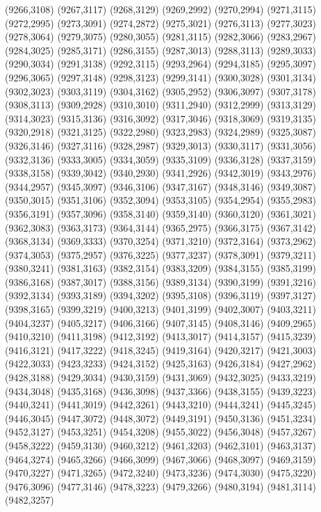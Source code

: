 (9266,3108)
(9267,3117)
(9268,3129)
(9269,2992)
(9270,2994)
(9271,3115)
(9272,2995)
(9273,3091)
(9274,2872)
(9275,3021)
(9276,3113)
(9277,3023)
(9278,3064)
(9279,3075)
(9280,3055)
(9281,3115)
(9282,3066)
(9283,2967)
(9284,3025)
(9285,3171)
(9286,3155)
(9287,3013)
(9288,3113)
(9289,3033)
(9290,3034)
(9291,3138)
(9292,3115)
(9293,2964)
(9294,3185)
(9295,3097)
(9296,3065)
(9297,3148)
(9298,3123)
(9299,3141)
(9300,3028)
(9301,3134)
(9302,3023)
(9303,3119)
(9304,3162)
(9305,2952)
(9306,3097)
(9307,3178)
(9308,3113)
(9309,2928)
(9310,3010)
(9311,2940)
(9312,2999)
(9313,3129)
(9314,3023)
(9315,3136)
(9316,3092)
(9317,3046)
(9318,3069)
(9319,3135)
(9320,2918)
(9321,3125)
(9322,2980)
(9323,2983)
(9324,2989)
(9325,3087)
(9326,3146)
(9327,3116)
(9328,2987)
(9329,3013)
(9330,3117)
(9331,3056)
(9332,3136)
(9333,3005)
(9334,3059)
(9335,3109)
(9336,3128)
(9337,3159)
(9338,3158)
(9339,3042)
(9340,2930)
(9341,2926)
(9342,3019)
(9343,2976)
(9344,2957)
(9345,3097)
(9346,3106)
(9347,3167)
(9348,3146)
(9349,3087)
(9350,3015)
(9351,3106)
(9352,3094)
(9353,3105)
(9354,2954)
(9355,2983)
(9356,3191)
(9357,3096)
(9358,3140)
(9359,3140)
(9360,3120)
(9361,3021)
(9362,3083)
(9363,3173)
(9364,3144)
(9365,2975)
(9366,3175)
(9367,3142)
(9368,3134)
(9369,3333)
(9370,3254)
(9371,3210)
(9372,3164)
(9373,2962)
(9374,3053)
(9375,2957)
(9376,3225)
(9377,3237)
(9378,3091)
(9379,3211)
(9380,3241)
(9381,3163)
(9382,3154)
(9383,3209)
(9384,3155)
(9385,3199)
(9386,3168)
(9387,3017)
(9388,3156)
(9389,3134)
(9390,3199)
(9391,3216)
(9392,3134)
(9393,3189)
(9394,3202)
(9395,3108)
(9396,3119)
(9397,3127)
(9398,3165)
(9399,3219)
(9400,3213)
(9401,3199)
(9402,3007)
(9403,3211)
(9404,3237)
(9405,3217)
(9406,3166)
(9407,3145)
(9408,3146)
(9409,2965)
(9410,3210)
(9411,3198)
(9412,3192)
(9413,3017)
(9414,3157)
(9415,3239)
(9416,3121)
(9417,3222)
(9418,3245)
(9419,3164)
(9420,3217)
(9421,3003)
(9422,3033)
(9423,3233)
(9424,3152)
(9425,3163)
(9426,3184)
(9427,2962)
(9428,3188)
(9429,3034)
(9430,3159)
(9431,3069)
(9432,3025)
(9433,3219)
(9434,3048)
(9435,3168)
(9436,3098)
(9437,3366)
(9438,3155)
(9439,3223)
(9440,3241)
(9441,3019)
(9442,3261)
(9443,3210)
(9444,3241)
(9445,3245)
(9446,3045)
(9447,3072)
(9448,3072)
(9449,3191)
(9450,3136)
(9451,3234)
(9452,3127)
(9453,3251)
(9454,3208)
(9455,3022)
(9456,3048)
(9457,3267)
(9458,3222)
(9459,3130)
(9460,3212)
(9461,3203)
(9462,3101)
(9463,3137)
(9464,3274)
(9465,3266)
(9466,3099)
(9467,3066)
(9468,3097)
(9469,3159)
(9470,3227)
(9471,3265)
(9472,3240)
(9473,3236)
(9474,3030)
(9475,3220)
(9476,3096)
(9477,3146)
(9478,3223)
(9479,3266)
(9480,3194)
(9481,3114)
(9482,3257)
